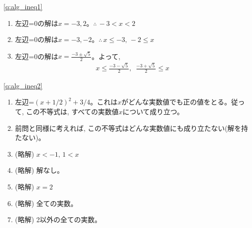 

\ref{q:alg_ineq1} 
\begin{enumerate}
\item 左辺=0の解は$x=-3, 2$。$\therefore\,-3<x<2$
\item 左辺=0の解は$x=-3, -2$。$\therefore\,x \leq -3,\, -2 \leq x$
\item 左辺=0の解は$x=\frac{-3\pm\sqrt{5}}{2}$。よって, 
\begin{eqnarray*}
x \leq \frac{-3-\sqrt{5}}{2},\,\,\, \frac{-3+\sqrt{5}}{2} \leq x
\end{eqnarray*}
\end{enumerate}

\ref{q:alg_ineq2} 
\begin{enumerate}
\item 左辺=$(x+1/2)^2+3/4$。これは$x$がどんな実数値でも正の値をとる。従って, この不等式は, すべての実数値$x$について成り立つ。
\item 前問と同様に考えれば, この不等式はどんな実数値にも成り立たない(解を持たない)。
\item (略解) $x<-1,\, 1<x$
\item (略解) 解なし。
\item (略解) $x=2$
\item (略解) 全ての実数。
\item (略解) 2以外の全ての実数。
\end{enumerate}
\mv

